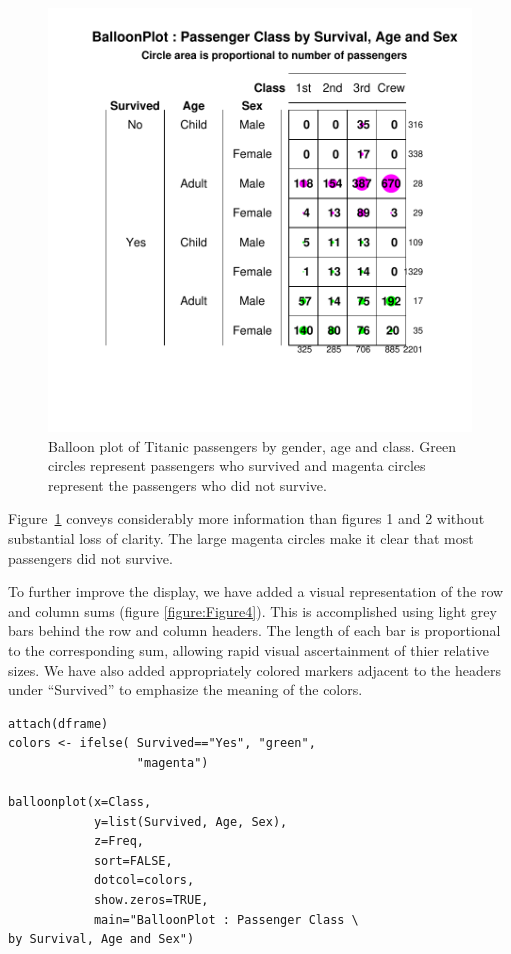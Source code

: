\documentclass[a4paper]{report}
\begin{document}
\begin{article}
\begin{figure}
\includegraphics[width=\textwidth]{Figure3.pdf}
\caption{\label{figure:Figure3}
  Balloon plot of Titanic passengers by gender, age and class. Green
  circles represent passengers who survived and magenta circles
  represent the passengers who did not survive.}
\end{figure}

Figure~\ref{figure:Figure3} conveys considerably more information than
figures 1 and 2 without substantial loss of clarity. The large magenta
circles make it clear that most passengers did not survive.

To further improve the display, we have added a visual
representation of the row and column sums (figure
\ref{figure:Figure4}).  This is accomplished using light grey bars
behind the row and column headers.  The length of each bar is
proportional to the corresponding sum, allowing rapid visual
ascertainment of thier relative sizes.  We have also added
appropriately colored markers adjacent to the headers under
``Survived'' to emphasize the meaning of the colors.

{
\small
\begin{verbatim}
attach(dframe)
colors <- ifelse( Survived=="Yes", "green", 
                  "magenta")

balloonplot(x=Class,
            y=list(Survived, Age, Sex),
            z=Freq,
            sort=FALSE,
            dotcol=colors,
            show.zeros=TRUE,
            main="BalloonPlot : Passenger Class \
by Survival, Age and Sex")


\end{verbatim}}
\end{article}
\end{document}
